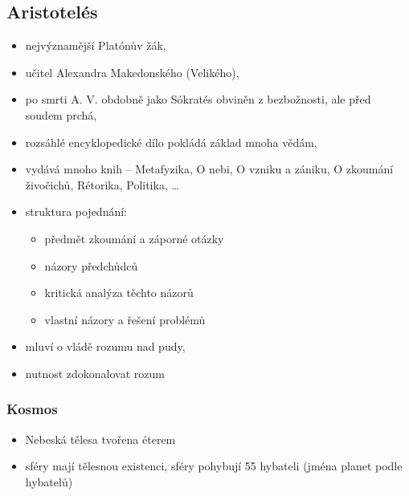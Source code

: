 \documentclass[11pt,a4paper,czech]{article}
\begin{document}
    \subsection{Aristotelés}

    \begin{itemize}
        \item nejvýznamější Platónův žák,
        \item učitel Alexandra Makedonského (Velikého),
        \item po smrti A. V. obdobně jako Sókratés obviněn z bezbožnosti, ale před soudem prchá,
        \item rozsáhlé encyklopedické dílo pokládá základ mnoha vědám,
        \item vydává mnoho knih -- Metafyzika, O nebi, O vzniku a zániku, O zkoumání živočichů, Rétorika, Politika, \dots
        \item struktura pojednání:
            \begin{itemize}
                \item předmět zkoumání a záporné otázky
                \item názory předchůdců
                \item kritická analýza těchto názorů
                \item vlastní názory a řešení problémů
            \end{itemize}
        \item mluví o vládě rozumu nad pudy,
        \item nutnost zdokonalovat rozum
    \end{itemize}

    \subsubsection{Kosmos}

    \begin{itemize}
        \item Nebeská tělesa tvořena éterem
        \item sféry mají tělesnou existenci, sféry pohybují 55 hybateli (jména planet podle hybatelů)
    \end{itemize}
\end{document}
